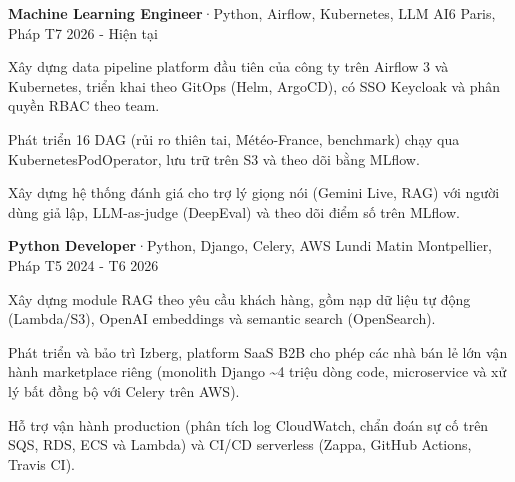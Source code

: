 

\begin{cventries}

  \cventry
    {\textbf{Machine Learning Engineer}{\enskip·\enskip}{\fontsize{7.5pt}{1em}\selectfont Python, Airflow, Kubernetes, LLM}} %
    {AI6} %
    {Paris, Pháp} %
    {T7 2026 - Hiện tại} %
    {
      \begin{cvitems} %
        \item {Xây dựng data pipeline platform đầu tiên của công ty trên Airflow 3 và Kubernetes, triển khai theo GitOps (Helm, ArgoCD), có SSO Keycloak và phân quyền RBAC theo team.}
        \item {Phát triển 16 DAG (rủi ro thiên tai, Météo-France, benchmark) chạy qua KubernetesPodOperator, lưu trữ trên S3 và theo dõi bằng MLflow.}
        \item {Xây dựng hệ thống đánh giá cho trợ lý giọng nói (Gemini Live, RAG) với người dùng giả lập, LLM-as-judge (DeepEval) và theo dõi điểm số trên MLflow.}
      \end{cvitems}
    }


  \cventry
    {\textbf{Python Developer}{\enskip·\enskip}{\fontsize{7.5pt}{1em}\selectfont Python, Django, Celery, AWS}} %
    {Lundi Matin} %
    {Montpellier, Pháp} %
    {T5 2024 - T6 2026} %
    {
      \begin{cvitems} %
        \item {Xây dựng module RAG theo yêu cầu khách hàng, gồm nạp dữ liệu tự động (Lambda/S3), OpenAI embeddings và semantic search (OpenSearch).}
        \item {Phát triển và bảo trì Izberg, platform SaaS B2B cho phép các nhà bán lẻ lớn vận hành marketplace riêng (monolith Django \textasciitilde 4 triệu dòng code, microservice và xử lý bất đồng bộ với Celery trên AWS).}
        \item {Hỗ trợ vận hành production (phân tích log CloudWatch, chẩn đoán sự cố trên SQS, RDS, ECS và Lambda) và CI/CD serverless (Zappa, GitHub Actions, Travis CI).}
      \end{cvitems}
    }



\end{cventries}

